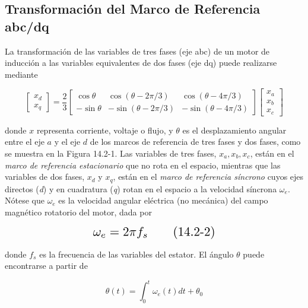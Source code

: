 \documentclass[letterpaper,12pt]{article} %
\begin{document}
\subsection{Transformación del Marco de Referencia abc/dq}

La transformación de las variables de tres fases (eje abc) de un motor de inducción a las variables equivalentes de dos fases (eje dq) puede realizarse mediante

\[
\begin{bmatrix}
x_d \\
x_q 
\end{bmatrix} 
= \frac{2}{3} 
\begin{bmatrix}
\cos \theta & \cos(\theta - 2\pi/3) & \cos(\theta - 4\pi/3) \\
-\sin \theta & -\sin(\theta - 2\pi/3) & -\sin(\theta - 4\pi/3)
\end{bmatrix}
\begin{bmatrix}
x_a \\
x_b \\
x_c 
\end{bmatrix} \tag{14.2-1}
\]

donde \( x \) representa corriente, voltaje o flujo, y \( \theta \) es el desplazamiento angular entre el eje \( a \) y el eje \( d \) de los marcos de referencia de tres fases y dos fases, como se muestra en la Figura 14.2-1. Las variables de tres fases, \( x_a, x_b, x_c \), están en el \textit{marco de referencia estacionario} que no rota en el espacio, mientras que las variables de dos fases, \( x_d \) y \( x_q \), están en el \textit{marco de referencia síncrono} cuyos ejes directos (\textit{d}) y en cuadratura (\textit{q}) rotan en el espacio a la velocidad síncrona \( \omega_e \). Nótese que \( \omega_e \) es la velocidad angular eléctrica (no mecánica) del campo magnético rotatorio del motor, dada por

\[
\scalebox{1.5}{$\omega_e = 2\pi f_s \tag{14.2-2}$}
\]

donde \( f_s \) es la frecuencia de las variables del estator. El ángulo \( \theta \) puede encontrarse a partir de

\[
\theta(t) = \int_{0}^{t} \omega_e(t) dt + \theta_0 \tag{14.2-3}
\]
\end{document}

